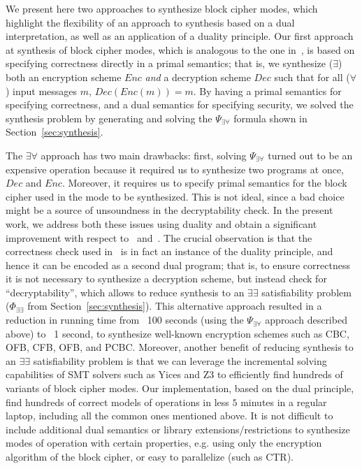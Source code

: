 \documentclass[preprint]{sig-alternate-05-2015}
\begin{document}
We present here two approaches to synthesize block cipher modes, 
which highlight the flexibility of an approach to synthesis 
based on a dual interpretation, as well as 
an application of a duality principle.
Our first approach at synthesis of block cipher modes, which is analogous to the 
one in~\cite{TGD15:CADE}, is based on 
specifying correctness 
directly in a primal semantics; that is, 
we synthesize ($\exists$) both an encryption scheme $Enc$ {\em{and}} a decryption
scheme $Dec$ such that for all ($\forall$) input messages $m$,
$Dec( Enc( m ) ) = m$. 
By having a primal semantics for specifying correctness, and a dual semantics
for specifying security, we solved the synthesis problem by generating
and solving the $\Psi_{\exists\forall}$ formula shown in Section~\ref{sec:synthesis}.

The $\exists\forall$ approach has two main drawbacks: first, solving 
$\Psi_{\exists\forall}$ turned out to be an expensive operation because 
it required us to synthesize two programs at once, $Dec$ and $Enc$. Moreover, 
it requires us to specify primal semantics for the block cipher
used in the mode to be synthesized. This is not ideal, since
a bad choice might be a source of unsoundness in the decryptability check.
In the present work, we address both these issues using duality and 
obtain a significant improvement with respect to~\cite{TGD15:CADE}
and~\cite{DBLP:conf/csfw/MalozemoffKG14}.
The crucial observation is that the correctness check used 
in~\cite{DBLP:conf/csfw/MalozemoffKG14} is in fact an instance of the duality principle, 
 and hence it can be 
encoded as a second dual program; that is,
to ensure correctness 
it is not necessary to synthesize a decryption scheme, but instead check for ``decryptability'',
which 
allows to reduce synthesis to an $\exists\exists$ satisfiability problem ($\Phi_{\exists\exists}$
from Section~\ref{sec:synthesis}). 
This alternative approach resulted in a reduction in running time
from ~100 seconds (using the $\Psi_{\exists\forall}$ approach described above) to
~1 second, to synthesize well-known encryption schemes such as CBC, OFB, CFB, OFB, and PCBC. 
Moreover, another benefit of 
reducing synthesis to an $\exists\exists$ satisfiability problem
is that we can leverage the incremental solving capabilities
of SMT solvers such as Yices and Z3 to efficiently
find hundreds of variants of block cipher modes.
Our implementation, based on the dual principle,
find hundreds 
of correct models of operations in less $5$ minutes in a regular laptop,
including all the common ones mentioned above.
It is not difficult to include additional 
dual semantics or library extensions/restrictions to synthesize
modes of operation with certain properties, e.g.
using only the encryption algorithm of the block cipher, 
or easy to parallelize (such as CTR).
\end{document}

